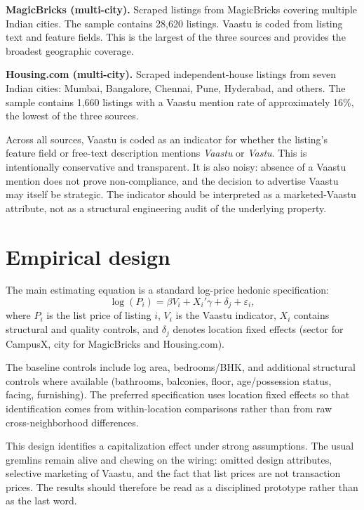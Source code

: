 \documentclass[11pt]{article}
\begin{document}
\textbf{MagicBricks (multi-city).} Scraped listings from MagicBricks covering multiple Indian cities. The sample contains 28,620 listings. Vaastu is coded from listing text and feature fields. This is the largest of the three sources and provides the broadest geographic coverage.

\textbf{Housing.com (multi-city).} Scraped independent-house listings from seven Indian cities: Mumbai, Bangalore, Chennai, Pune, Hyderabad, and others. The sample contains 1,660 listings with a Vaastu mention rate of approximately 16\%, the lowest of the three sources.

Across all sources, Vaastu is coded as an indicator for whether the listing's feature field or free-text description mentions \emph{Vaastu} or \emph{Vastu}. This is intentionally conservative and transparent. It is also noisy: absence of a Vaastu mention does not prove non-compliance, and the decision to advertise Vaastu may itself be strategic. The indicator should be interpreted as a marketed-Vaastu attribute, not as a structural engineering audit of the underlying property.

\section{Empirical design}

The main estimating equation is a standard log-price hedonic specification:
\begin{equation}
\log(P_i) = \beta V_i + X_i'\gamma + \delta_j + \varepsilon_i,
\end{equation}
where $P_i$ is the list price of listing $i$, $V_i$ is the Vaastu indicator, $X_i$ contains structural and quality controls, and $\delta_j$ denotes location fixed effects (sector for CampusX, city for MagicBricks and Housing.com).

The baseline controls include log area, bedrooms/BHK, and additional structural controls where available (bathrooms, balconies, floor, age/possession status, facing, furnishing). The preferred specification uses location fixed effects so that identification comes from within-location comparisons rather than from raw cross-neighborhood differences.

This design identifies a capitalization effect under strong assumptions. The usual gremlins remain alive and chewing on the wiring: omitted design attributes, selective marketing of Vaastu, and the fact that list prices are not transaction prices. The results should therefore be read as a disciplined prototype rather than as the last word.
\end{document}
